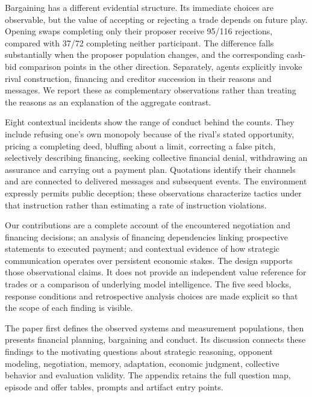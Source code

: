 Bargaining has a different evidential structure. Its immediate choices are observable, but the value of accepting or rejecting a trade depends on future play. Opening swaps completing only their proposer receive 95/116 rejections, compared with 37/72 completing neither participant. The difference falls substantially when the proposer population changes, and the corresponding cash-bid comparison points in the other direction. Separately, agents explicitly invoke rival construction, financing and creditor succession in their reasons and messages. We report these as complementary observations rather than treating the reasons as an explanation of the aggregate contrast.

Eight contextual incidents show the range of conduct behind the counts. They include refusing one's own monopoly because of the rival's stated opportunity, pricing a completing deed, bluffing about a limit, correcting a false pitch, selectively describing financing, seeking collective financial denial, withdrawing an assurance and carrying out a payment plan. Quotations identify their channels and are connected to delivered messages and subsequent events. The environment expressly permits public deception; these observations characterize tactics under that instruction rather than estimating a rate of instruction violations.

Our contributions are a complete account of the encountered negotiation and financing decisions; an analysis of financing dependencies linking prospective statements to executed payment; and contextual evidence of how strategic communication operates over persistent economic stakes. The design supports those observational claims. It does not provide an independent value reference for trades or a comparison of underlying model intelligence. The five seed blocks, response conditions and retrospective analysis choices are made explicit so that the scope of each finding is visible.

The paper first defines the observed systems and measurement populations, then presents financial planning, bargaining and conduct. Its discussion connects these findings to the motivating questions about strategic reasoning, opponent modeling, negotiation, memory, adaptation, economic judgment, collective behavior and evaluation validity. The appendix retains the full question map, episode and offer tables, prompts and artifact entry points.
